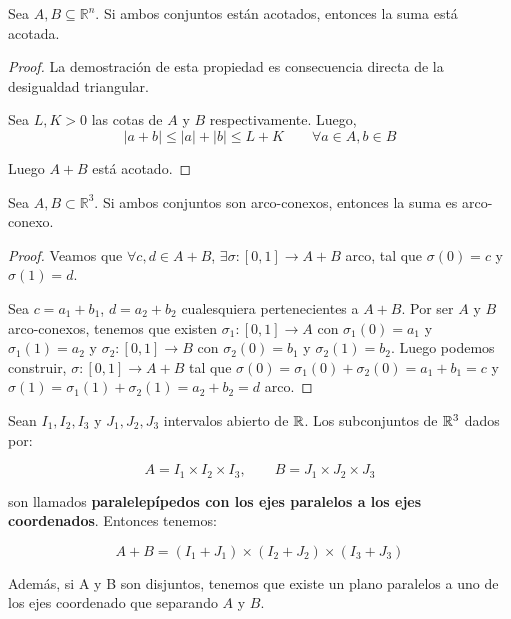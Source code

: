 \begin{lemma}
Sea $A,B \subseteq \mathbb{R}^n$. Si ambos conjuntos están acotados, entonces la suma está acotada.
\end{lemma}
\begin{proof}
La demostración de esta propiedad es consecuencia directa de la desigualdad triangular.

Sea $L,K > 0$ las cotas de $A$ y $B$ respectivamente. Luego,
\begin{equation*}
    |a+b| \leq |a|+|b| \leq L + K \qquad \forall a \in A, b\in B
\end{equation*}

Luego $A+B$ está acotado.
\end{proof}


\begin{lemma}
Sea $A,B \subset \mathbb{R}^3$. Si ambos conjuntos son arco-conexos, entonces la suma es arco-conexo.
\end{lemma}
\begin{proof}
Veamos que $\forall c,d \in A+B$, $\exists \sigma: [0,1] \longrightarrow A+B$ arco, tal que $\sigma(0)=c$ y $\sigma(1)=d$.

Sea $c=a_1 + b_1$, $d=a_2+b_2$ cualesquiera pertenecientes a $A+B$. Por ser $A$ y $B$ arco-conexos, tenemos que existen $\sigma_1: [0,1] \longrightarrow A$ con $\sigma_1(0)=a_1$ y $\sigma_1(1)=a_2$ y $\sigma_2: [0,1] \longrightarrow B$ con $\sigma_2(0)=b_1$ y $\sigma_2(1)=b_2$. Luego podemos construir, $\sigma: [0,1] \longrightarrow A+B$ tal que $\sigma(0)=\sigma_1(0) + \sigma_2(0) = a_1+b_1 = c$ y $\sigma(1)=\sigma_1(1) + \sigma_2(1) = a_2+b_2 = d$ arco.
\end{proof}

\begin{lemma}\label{paralelepipedoslemma}
Sean $I_1, I_2, I_3$ y $J_1, J_2, J_3$ intervalos abierto de $\mathbb{R}$. Los subconjuntos de $\mathbb{R}^3$ dados por:

\begin{equation*}
    A = I_1 \times I_2 \times I_3, \qquad B = J_1 \times J_2 \times J_3
\end{equation*}

son llamados \textbf{paralelepípedos con los ejes paralelos a los ejes coordenados}. Entonces tenemos:

\begin{equation*}
    A + B = (I_1 + J_1) \times (I_2 + J_2) \times (I_3 + J_3)
\end{equation*}

Además, si A y B son disjuntos, tenemos que existe un plano paralelos a uno de los ejes coordenado que separando $A$ y $B$.
\end{lemma}


